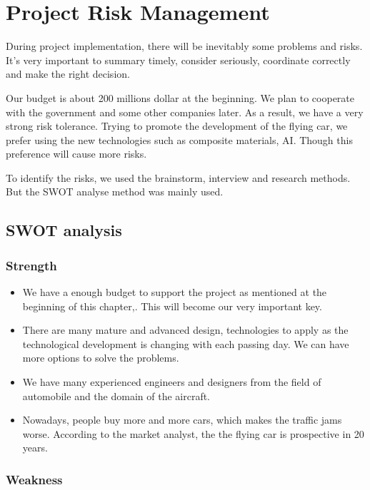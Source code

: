 \chapter{Project Risk Management}

During project implementation, there will be inevitably some problems and risks. It's very important to summary timely, consider seriously, coordinate correctly and make the right decision.

Our budget is about 200 millions dollar at the beginning. We plan to cooperate with the government and some other companies later. As a result, we have a very strong risk tolerance. Trying to promote the development of the flying car, we prefer using the new technologies such as composite materials, AI. Though this preference will cause more risks.

To identify the risks, we used the brainstorm, interview and research methods. But the SWOT analyse method was mainly used. 

\section{SWOT analysis}

\subsection{Strength}

\begin{itemize}
\item We have a enough budget to support the project as mentioned at the beginning of this chapter,. This will become our very important key. 
\item There are many mature and advanced design, technologies to apply as the technological development is changing with each passing day. We can have more options to solve the problems.
\item We have many experienced engineers and designers from the field of automobile and the domain of the aircraft.
\item Nowadays, people buy more and more cars, which makes the traffic jams worse. According to the market analyst, the the flying car is prospective in 20 years. 
\end{itemize}

\subsection{Weakness}


